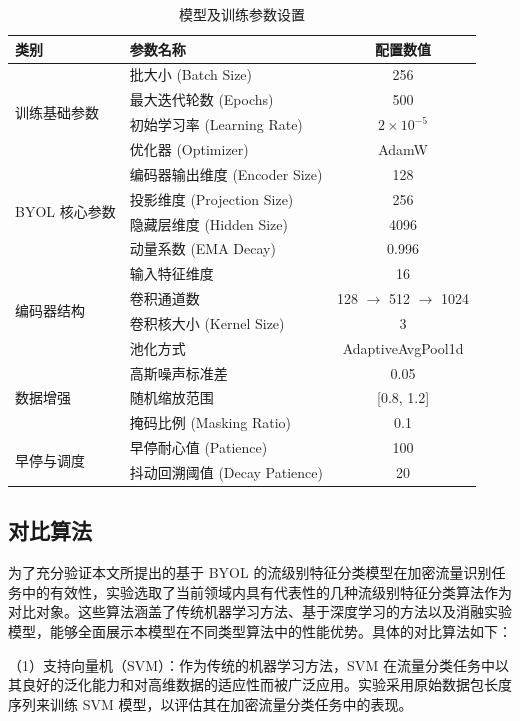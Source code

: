 \begin{table}[htbp]
\centering
\caption{模型及训练参数设置}
\label{tab:parameters}
\begin{tabular}{llc}
\hline
\textbf{类别} & \textbf{参数名称} & \textbf{配置数值} \\ \hline
\multirow{4}{*}{训练基础参数} & 批大小 (Batch Size) & 256 \\
 & 最大迭代轮数 (Epochs) & 500 \\
 & 初始学习率 (Learning Rate) & $2 \times 10^{-5}$ \\
 & 优化器 (Optimizer) & AdamW \\ \hline
\multirow{4}{*}{BYOL 核心参数} & 编码器输出维度 (Encoder Size) & 128 \\ & 投影维度 (Projection Size) & 256 \\
 & 隐藏层维度 (Hidden Size) & 4096 \\
 & 动量系数 (EMA Decay) & 0.996 \\ \hline
\multirow{4}{*}{编码器结构} & 输入特征维度 & 16 \\
 & 卷积通道数 & 128 $\rightarrow$ 512 $\rightarrow$ 1024 \\
 & 卷积核大小 (Kernel Size) & 3 \\
 & 池化方式 & AdaptiveAvgPool1d \\ \hline
\multirow{3}{*}{数据增强} & 高斯噪声标准差 & 0.05 \\
 & 随机缩放范围 & [0.8, 1.2] \\
 & 掩码比例 (Masking Ratio) & 0.1 \\ \hline
\multirow{2}{*}{早停与调度} & 早停耐心值 (Patience) & 100 \\
 & 抖动回溯阈值 (Decay Patience) & 20 \\ \hline
\end{tabular}
\end{table}

\subsection{对比算法}
为了充分验证本文所提出的基于 BYOL 的流级别特征分类模型在加密流量识别任务中的有效性，实验选取了当前领域内具有代表性的几种流级别特征分类算法作为对比对象。这些算法涵盖了传统机器学习方法、基于深度学习的方法以及消融实验模型，能够全面展示本模型在不同类型算法中的性能优势。具体的对比算法如下：

（1）支持向量机（SVM）：作为传统的机器学习方法，SVM 在流量分类任务中以其良好的泛化能力和对高维数据的适应性而被广泛应用。实验采用原始数据包长度序列来训练 SVM 模型，以评估其在加密流量分类任务中的表现。

